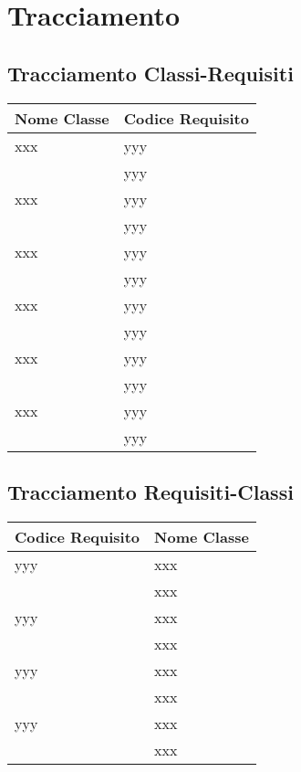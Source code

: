 \newpage
\renewcommand*{\arraystretch}{1.6}

\section{Tracciamento}

	\subsection{Tracciamento Classi-Requisiti}

		\begin{longtable}{ p{12cm} | p{4cm} }
			\hline
			\textbf{Nome Classe} & \textbf{Codice Requisito} \\
			\hline
			xxx
			& yyy \\
			& yyy \\
			\hline
			xxx
			& yyy \\
			& yyy \\
			\hline
			xxx
			& yyy \\
			& yyy \\
			\hline
			xxx
			& yyy \\
			& yyy \\
			\hline
			xxx
			& yyy \\
			& yyy \\
			\hline
			xxx
			& yyy \\
			& yyy \\
			\hline		
	\end{longtable}

	\newpage
	\subsection{Tracciamento Requisiti-Classi}

		\begin{longtable}{ p{4cm} | p{12cm} }
			\hline
			\textbf{Codice Requisito} & \textbf{Nome Classe} \\
			\hline yyy
			& xxx \\ 
			& xxx \\
			\hline yyy
			& xxx \\ 
			& xxx \\
			\hline yyy
			& xxx \\ 
			& xxx \\
			\hline yyy
			& xxx \\ 
			& xxx \\
			\hline			
		\end{longtable}
	
